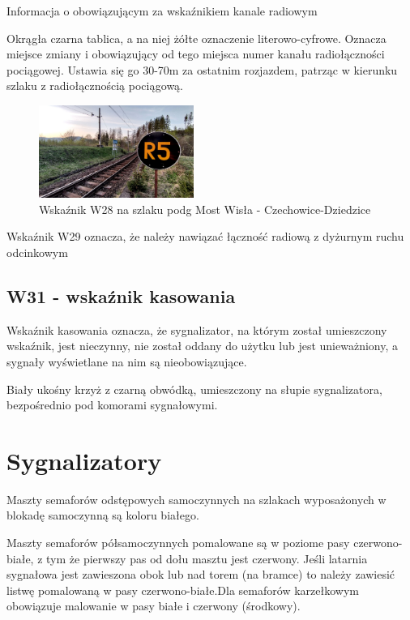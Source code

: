 \begin{tcolorbox}[colback=black!5!white,colframe=white!55!black,title=Wskaźnik W28]Informacja o obowiązującym za wskaźnikiem kanale radiowym
\end{tcolorbox}
Okrągła czarna tablica, a na niej żółte oznaczenie literowo-cyfrowe. Oznacza miejsce zmiany i obowiązujący od tego miejsca numer kanału radiołączności pociągowej. Ustawia się go 30-70m za ostatnim rozjazdem, patrząc w kierunku szlaku z radiołącznością pociągową.
\begin{figure}
		\includegraphics[width=0.45\textwidth]{skryptkierownik-img/wskaznik-w28.jpg}
		\caption{Wskaźnik W28 na szlaku podg Most Wisła - Czechowice-Dziedzice}
		\label{fig:w28}
\end{figure}

Wskaźnik W29 oznacza, że należy nawiązać łączność radiową z dyżurnym ruchu odcinkowym

\subsection{W31 - wskaźnik kasowania}
\begin{tcolorbox}[colback=black!5!white,colframe=white!55!black,title=Wskaźnik W31]
{\textquotedbl}Wskaźnik kasowania{\textquotedbl} oznacza, że sygnalizator, na którym został umieszczony wskaźnik, jest nieczynny, nie został oddany do użytku lub jest unieważniony, a sygnały wyświetlane na nim są nieobowiązujące.
\end{tcolorbox}
Biały ukośny krzyż z czarną obwódką, umieszczony na słupie sygnalizatora, bezpośrednio pod komorami sygnałowymi.

\section{Sygnalizatory}

Maszty semaforów odstępowych samoczynnych na szlakach wyposażonych w blokadę samoczynną są koloru białego.

Maszty semaforów półsamoczynnych pomalowane są w poziome pasy czerwono-białe, z tym że pierwszy pas od dołu masztu jest czerwony. Jeśli latarnia sygnałowa jest zawieszona obok lub nad torem (na bramce) to należy zawiesić listwę pomalowaną
w pasy czerwono-białe.Dla semaforów karzełkowym obowiązuje malowanie w pasy białe i czerwony (środkowy).


